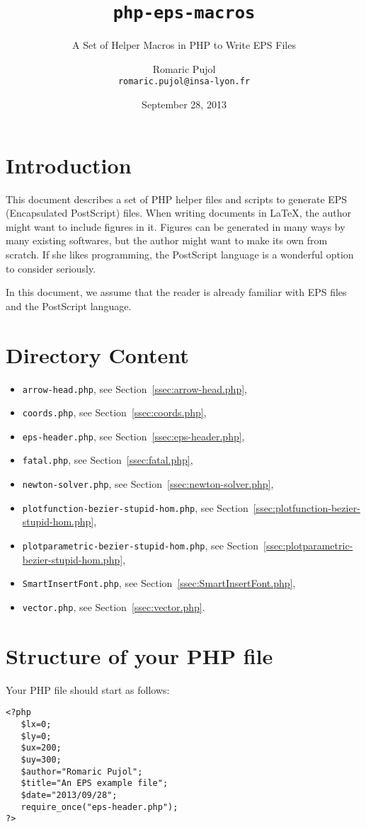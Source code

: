 \documentclass[10pt,a4paper]{scrartcl}
\title{\texttt{php-eps-macros}}
\subtitle{A Set of Helper Macros in PHP to Write EPS Files}
\author{Romaric Pujol\\\footnotesize{\texttt{romaric.pujol@insa-lyon.fr}}}
\date{September 28, 2013}
\newcommand\PS{PostScript}
\begin{document}
\maketitle
\section{Introduction}
This document describes a set of PHP helper files and scripts to generate EPS
   (Encapsulated \PS) files.
When writing documents in \LaTeX, the author might want to include figures in
   it.
Figures can be generated in many ways by many existing softwares, but the
   author might want to make its own from scratch.
If she likes programming, the PostScript language is a wonderful option to
   consider seriously.

In this document, we assume that the reader is already familiar with EPS files
and the \PS{} language.

\section{Directory Content}
\begin{itemize}
\item \texttt{arrow-head.php}, see Section~\ref{ssec:arrow-head.php},
\item \texttt{coords.php}, see Section~\ref{ssec:coords.php},
\item \texttt{eps-header.php}, see Section~\ref{ssec:eps-header.php},
\item \texttt{fatal.php}, see Section~\ref{ssec:fatal.php},
\item \texttt{newton-solver.php}, see Section~\ref{ssec:newton-solver.php},
\item \texttt{plotfunction-bezier-stupid-hom.php}, see Section~\ref{ssec:plotfunction-bezier-stupid-hom.php},
\item \texttt{plotparametric-bezier-stupid-hom.php}, see Section~\ref{ssec:plotparametric-bezier-stupid-hom.php},
\item \texttt{SmartInsertFont.php}, see Section~\ref{ssec:SmartInsertFont.php},
\item \texttt{vector.php}, see Section~\ref{ssec:vector.php}.
\end{itemize}

\section{Structure of your PHP file}
Your PHP file should start as follows:
\lstset{language=PHP}
\begin{lstlisting}
<?php
   $lx=0;
   $ly=0;
   $ux=200;
   $uy=300;
   $author="Romaric Pujol";
   $title="An EPS example file";
   $date="2013/09/28";
   require_once("eps-header.php");
?>
\end{lstlisting}
\end{document}
